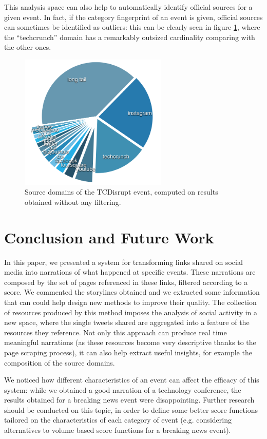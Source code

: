 \documentclass{sig-alternate}
\begin{document}
This analysis space can also help to automatically identify official sources for a given event. In fact, if the category fingerprint of an event is given, official sources can sometimes be identified as outliers: this can be clearly seen in figure \ref{fig:tcdisrupt_outlier}, where the ``techcrunch'' domain has a remarkably outsized cardinality comparing with the other ones.
\begin{figure}[htbp]
  \centering
  \includegraphics[width=7cm]{Figures/tcdisrupt_outlier.png}
  \caption{Source domains of the TCDisrupt event, computed on results obtained without any filtering.}
  \label{fig:tcdisrupt_outlier}
\end{figure}

\section{Conclusion and Future Work}
\label{sec:conclusions}
In this paper, we presented a system for transforming links shared on social media into narrations of what happened at specific events. These narrations are composed by the set of pages referenced in these links, filtered according to a score. We commented the storylines obtained and we extracted some information that can could help design new methods to improve their quality. The collection of resources produced by this method imposes the analysis of social activity in a new space, where the single tweets shared are aggregated into a feature of the resources they reference. Not only this approach can produce real time meaningful narrations (as these resources become very descriptive thanks to the page scraping process), it can also help extract useful insights, for example the composition of the source domains.

We noticed how different characteristics of an event can affect the efficacy of this system: while we obtained a good narration of a technology conference, the results obtained for a breaking news event were disappointing. Further research should be conducted on this topic, in order to define some better score functions tailored on the characteristics of each category of event (e.g. considering alternatives to volume based score functions for a breaking news event).
\end{document}
